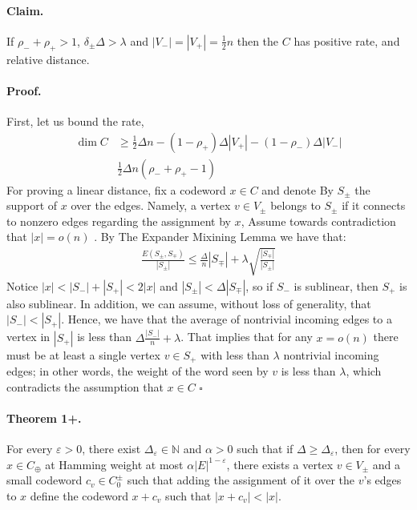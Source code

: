 \documentclass{article}
\begin{document}
\begin{multicols*}{2}
\paragraph{Claim.} If $\rho_{-} + \rho_{+} > 1$, $\delta_{\pm}\Delta > \lambda$ and $|V_{-}| = |V_{+}| = \frac{1}{2}n$ then the $C$ has positive rate, and relative distance. 
\paragraph{Proof.} First, let us bound the rate, 
\begin{equation*}
  \begin{split}
    \dim C & \ge \frac{1}{2}\Delta n - \left( 1 - \rho_{+} \right)\Delta|V_{+}| - \left( 1 - \rho_{-} \right)\Delta|V_{-}| \\
    & \frac{1}{2}\Delta n \left( \rho_{-} + \rho_{+}  - 1  \right) 
  \end{split}
\end{equation*}
For proving a linear distance, fix a codeword $x \in C$ and denote By $S_{\pm}$ the support of $x$ over the edges. Namely, a vertex $v\in V_{\pm}$ belongs to $S_{\pm}$ if it connects to nonzero edges regarding the assignment by $x$, Assume towards contradiction that $|x| = o\left( n \right)$ . By The Expander Mixining Lemma we have that: 
\begin{equation*}
  \begin{split}
    \frac{E\left( S_{\pm}, S_{\mp} \right)}{|S_{\pm}|}\le\frac{\Delta}{n}|S_{\mp}| + \lambda\sqrt{\frac{|S_{\mp}|}{|S_{\pm}|}}
  \end{split}
\end{equation*}
Notice $|x| < |S_{-}| + |S_{+}| < 2|x|$ and $|S_{\pm}| < \Delta |S_{\mp}|$, so if $S_{-}$ is sublinear, then $S_{+}$ is also sublinear. In addition, we can assume, without loss of generality, that $|S_{-}| < |S_{+}|$. Hence, we have that the average of nontrivial incoming edges to a vertex in $|S_{+}|$ is less than $ \Delta \frac{|S_{-}|}{n} + \lambda $. That implies that for any $x = o\left( n \right)$ there must be at least a single vertex $ v \in S_{+} $ with less than $ \lambda $ nontrivial incoming edges; in other words, the weight of the word seen by $v$ is less than $\lambda$, which contradicts the assumption that $x\in C$ $\square$

\paragraph{Theorem 1+.} For every $\varepsilon > 0$, there exist $\Delta_{\varepsilon}\in \mathbb{N}$ and $\alpha>0$ such that if $\Delta \ge \Delta_{\varepsilon}$, then for every $x \in C_{\oplus}$ at Hamming weight at most $\alpha |E|^{1-\varepsilon}$, there exists a vertex $v \in V_{\pm}$ and a small codeword $c_{v} \in C_{0}^{\pm} $ such that adding the assignment of it over the $v$'s edges to $x$ define the codeword $x + c_{v}$  such that $|x + c_{v}| < |x|$.  


\end{multicols*}
\end{document}
